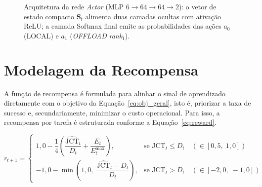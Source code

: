 \begin{figure}[htb]
{%
}
\caption{Arquitetura da rede \textit{Actor} (\gls{MLP} $6 \to 64 \to 64 \to 2$): o vetor de estado compacto $\mathbf{S}_t$ alimenta duas camadas ocultas com ativação ReLU; a camada Softmax final emite as probabilidades das ações $a_0$ (LOCAL) e $a_1$ (\textit{OFFLOAD} \textit{rank}$_1$).}
\label{fig:mlp-arch}
\end{figure}

\section*{Modelagem da Recompensa}

A função de recompensa é formulada para alinhar o sinal de aprendizado diretamente com o objetivo da Equação~\ref{eq:obj_geral}, isto é, priorizar a taxa de sucesso e, secundariamente, minimizar o custo operacional. Para isso, a recompensa por tarefa é estruturada conforme a Equação~\ref{eq:reward}.

\begin{equation}
    r_{t+1} =
    \begin{cases}
        1{,}0 - \dfrac{1}{4}\!\left(\dfrac{\widehat{\text{JCT}}_t}{D_t} + \dfrac{E_t}{E^{\text{max}}_t}\right), & \text{se } \widehat{\text{JCT}}_t \leq D_t \quad (\in [0{,}5,\;1{,}0]) \\[8pt]
        -1{,}0 - \min\!\left(1{,}0,\; \dfrac{\widehat{\text{JCT}}_t - D_t}{D_t}\right), & \text{se } \widehat{\text{JCT}}_t > D_t \quad (\in [-2{,}0,\;-1{,}0])
    \end{cases}
    \label{eq:reward}
\end{equation}

